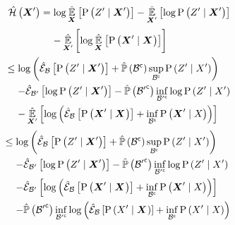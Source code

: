 \begin{proofE}
	\begin{align}
		\begin{split}
			\entropyEstimator{\statesRV{}^\prime}&=\log\estimator{\probcond{\observations{}^\prime}{\statesRV{}^\prime}}{\statesRV{}}-\estimator{\log\probcond{\observations{}^\prime}{\statesRV{}^\prime}}{\statesRV{}^\prime}\\
			&\phantomeq-\estimator{\log\estimator{\probcond{\statesRV{}^\prime}{\statesRV{}}}{\statesRV{}}}{\statesRV{}^\prime}
		\end{split}\\
		\begin{split}
			&\leq\log\left(\partialestimator{\probcond{\observations{}^\prime}{\statesRV{}^\prime}}{\subSpace}+\estimatedmeasure{\stcomp{\subSpace}}\sup_{\stcomp{\subSpace}}\probcond{\observations{}^\prime}{\states{}^\prime}\right)\\
			&\phantomeq-\partialestimator{\log\probcond{\observations{}^\prime}{\statesRV{}^\prime}}{\subSpace^\prime}-\estimatedmeasure{\stcomp{\subSpace^\prime}}\inf_{\stcomp{\subSpace^\prime}}\log\probcond{\observations{}^\prime}{\states{}^\prime}\\
			&\phantomeq-\estimator{\log\left(\partialestimator{\probcond{\statesRV{}^\prime}{\statesRV{}}}{\subSpace}+\inf_{\stcomp{\subSpace}}\probcond{\statesRV{}^\prime}{\states{}}\right)}{\statesRV{}^\prime}
		\end{split}\\
		\begin{split}
			&\leq\log\left(\partialestimator{\probcond{\observations{}^\prime}{\statesRV{}^\prime}}{\subSpace}+\estimatedmeasure{\stcomp{\subSpace}}\sup_{\stcomp{\subSpace}}\probcond{\observations{}^\prime}{\states{}^\prime}\right)\\
			&\phantomeq-\partialestimator{\log\probcond{\observations{}^\prime}{\statesRV{}^\prime}}{\subSpace^\prime}-\estimatedmeasure{\stcomp{\subSpace^\prime}}\inf_{\stcomp{\subSpace^\prime}}\log\probcond{\observations{}^\prime}{\states{}^\prime}\\
			&\phantomeq-\partialestimator{\log\left(\partialestimator{\probcond{\statesRV{}^\prime}{\statesRV{}}}{\subSpace}+\inf_{\stcomp{\subSpace}}\probcond{\statesRV{}^\prime}{\states{}}\right)}{\subSpace^\prime}\\
			&\phantomeq-\estimatedmeasure{\stcomp{\subSpace^\prime}}\inf_{\stcomp{\subSpace^\prime}}\log\left(\partialestimator{\probcond{\states{}^\prime}{\statesRV{}}}{\subSpace}+\inf_{\stcomp{\subSpace}}\probcond{\states{}^\prime}{\states{}}\right)

\end{split}
\end{align}
\end{proofE}
